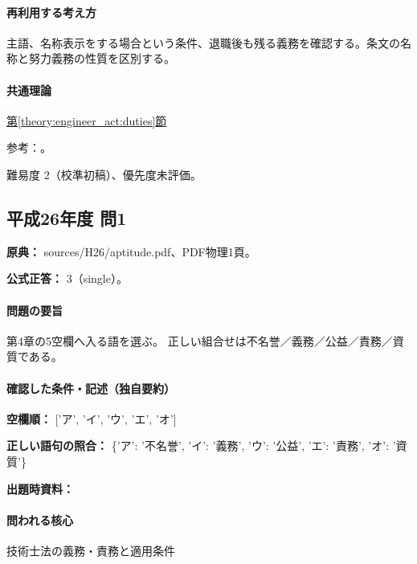 \paragraph{再利用する考え方} 主語、名称表示をする場合という条件、退職後も残る義務を確認する。条文の名称と努力義務の性質を区別する。

\paragraph{共通理論} \hyperref[theory:engineer_act:duties]{第\ref*{theory:engineer_act:duties}節}

\par 参考：\cite{engineer_act_current}。

\par 難易度 2（校準初稿）、優先度未評価。

\subsection{平成26年度 問1}
\label{q:h26-reg-apt-01}

\noindent\textbf{原典：} sources/H26/aptitude.pdf、PDF物理1頁。

\textbf{公式正答：} 3（single）。

\paragraph{問題の要旨} 第4章の5空欄へ入る語を選ぶ。 正しい組合せは不名誉／義務／公益／責務／資質である。

\paragraph{確認した条件・記述（独自要約）}\mbox{}\par

\noindent\textbf{空欄順：} ['ア', 'イ', 'ウ', 'エ', 'オ']\par

\noindent\textbf{正しい語句の照合：} \{'ア': '不名誉', 'イ': '義務', 'ウ': '公益', 'エ': '責務', 'オ': '資質'\}\par

\noindent\textbf{出題時資料：} \par

\paragraph{問われる核心} 技術士法の義務・責務と適用条件

